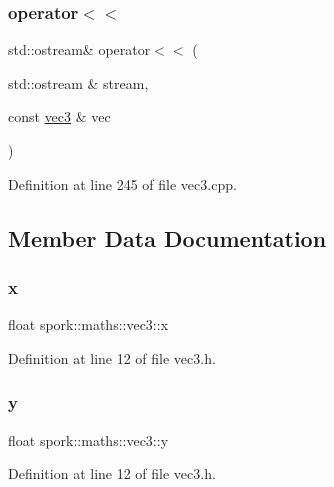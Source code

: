 \subsubsection{\texorpdfstring{operator$<$$<$}{operator<<}}
{\footnotesize\ttfamily std\+::ostream\& operator$<$$<$ (\begin{DoxyParamCaption}\item[{std\+::ostream \&}]{stream,  }\item[{const \hyperlink{structspork_1_1maths_1_1vec3}{vec3} \&}]{vec }\end{DoxyParamCaption})\hspace{0.3cm}{\ttfamily [friend]}}



Definition at line 245 of file vec3.\+cpp.



\subsection{Member Data Documentation}
\mbox{\label{structspork_1_1maths_1_1vec3_a0ad9ff5d633e78698328da4697e6429c}} 
\subsubsection{\texorpdfstring{x}{x}}
{\footnotesize\ttfamily float spork\+::maths\+::vec3\+::x}



Definition at line 12 of file vec3.\+h.

\mbox{\label{structspork_1_1maths_1_1vec3_a52923b4784782eef93946328931a30cc}} 
\subsubsection{\texorpdfstring{y}{y}}
{\footnotesize\ttfamily float spork\+::maths\+::vec3\+::y}



Definition at line 12 of file vec3.\+h.

\mbox{\label{structspork_1_1maths_1_1vec3_ac6c368d1e1e30be899a7e02cfa55354d}} 
